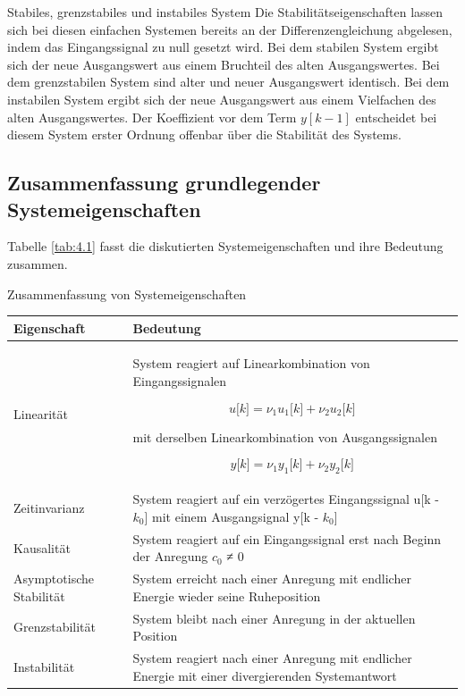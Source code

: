 \begin{example}{Stabiles, grenzstabiles und instabiles System}
Die Stabilitätseigenschaften lassen sich bei diesen einfachen Systemen bereits an der Differenzengleichung abgelesen, indem das Eingangssignal zu null gesetzt wird. Bei dem stabilen System ergibt sich der neue Ausgangswert aus einem Bruchteil des alten Ausgangswertes. Bei dem grenzstabilen System sind alter und neuer Ausgangswert identisch. Bei dem instabilen System ergibt sich der neue Ausgangswert aus einem Vielfachen des alten Ausgangswertes. Der Koeffizient vor dem Term \(y[k - 1]\) entscheidet bei diesem System erster Ordnung offenbar über die Stabilität des Systems.

\end{example}

\subsection{\texorpdfstring{Zusammenfassung grundlegender Systemeigenschaften }{Zusammenfassung grundlegender Systemeigenschaften }}\label{zusammenfassung-grundlegender-systemeigenschaften}

Tabelle \ref{tab:4.1} fasst die diskutierten Systemeigenschaften und ihre Bedeutung zusammen.

\begin{summary}{Zusammenfassung von Systemeigenschaften}
\label{tab:4.1}
\begin{center}
  \begin{tabular}{ll}
    \toprule
    Eigenschaft & Bedeutung \\
    \midrule
    Linearität & 
System reagiert auf Linearkombination 
von Eingangssignalen

\[u\lbrack k\rbrack = \nu_{1}  u_{1}\lbrack k\rbrack + \nu_{2}  u_{2}\lbrack k\rbrack\]

mit derselben Linearkombination 
von Ausgangssignalen

\[y\lbrack k\rbrack = \nu_{1}  y_{1}\lbrack k\rbrack + \nu_{2}  y_{2}\lbrack k\rbrack\] \\
    Zeitinvarianz & 
System reagiert auf ein verzögertes 
Eingangssignal u{[}k - \(k_{0}\){]} 
mit einem Ausgangsignal y{[}k - \(k_{0}\){]} \\
    Kausalität & 
System reagiert auf ein Eingangssignal 
erst nach Beginn der Anregung 
\(c_{0}\) ≠ 0 \\
    Asymptotische Stabilität & 
System erreicht nach einer Anregung 
mit endlicher Energie wieder seine Ruheposition \\
    Grenzstabilität & 
System bleibt nach einer Anregung 
in der aktuellen Position \\
    Instabilität & System reagiert nach einer Anregung mit endlicher Energie mit einer divergierenden Systemantwort \\
    \bottomrule
  \end{tabular}
\end{center}
\end{summary}

